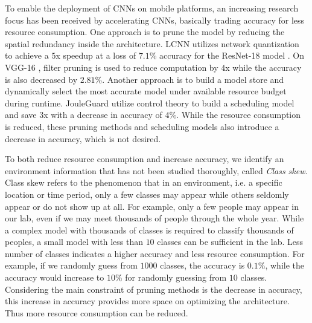 \documentclass[pageno]{jpaper}
\begin{document}
To enable the deployment of CNNs on mobile platforms, an increasing research focus has been received by accelerating CNNs, basically trading accuracy for less resource consumption. One approach is to prune the model by reducing the spatial redundancy inside the architecture. LCNN \cite{bagherinezhad2017lcnn} utilizes network quantization to achieve a $5$x speedup at a loss of $7.1$\% accuracy for the ResNet-18 model \cite{he2016deep}. On VGG-16 \cite{simonyan2014very}, filter pruning \cite{lin2018accelerating} is used to reduce computation by $4$x while the accuracy is also decreased by $2.81$\%. Another approach is to build a model store and dynamically select the most accurate model under available resource budget during runtime. JouleGuard \cite{hoffmann2015jouleguard} utilize control theory to build a scheduling model and save $3$x with a decrease in accuracy of $4$\%. While the resource consumption is reduced, these pruning methods and scheduling models also introduce a decrease in accuracy, which is not desired.


To both reduce resource consumption and increase accuracy, we identify an environment information that has not been studied thoroughly, called \textit{Class skew}. Class skew refers to the phenomenon that in an environment, i.e. a specific location or time period, only a few classes may appear while others seldomly appear or do not show up at all. For example, only a few people may appear in our lab, even if we may meet thousands of people through the whole year. While a complex model with thousands of classes is required to classify thousands of peoples, a small model with less than $10$ classes can be sufficient in the lab. Less number of classes indicates a higher accuracy and less resource consumption. For example, if we randomly guess from $1000$ classes, the accuracy is $0.1\%$, while the accuracy would increase to $10\%$ for randomly guessing from $10$ classes. Considering the main constraint of pruning methods is the decrease in accuracy, this increase in accuracy provides more space on optimizing the architecture. Thus more resource consumption can be reduced.
\end{document}
